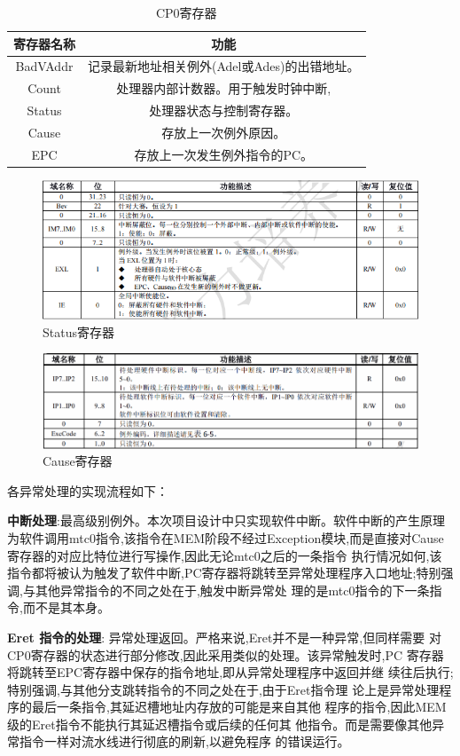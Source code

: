 \begin{table}[h]
\centering
\begin{tabular}{|c|c|} \hline 
	寄存器名称& 功能\\ \hline 
	BadVAddr& 记录最新地址相关例外(Adel或Ades)的出错地址。\\ \hline 
	Count& 处理器内部计数器。用于触发时钟中断,\\ \hline 
	Status& 处理器状态与控制寄存器。\\ \hline 
	Cause& 存放上一次例外原因。\\ \hline
	EPC&存放上一次发生例外指令的PC。\\\hline
\end{tabular}
\caption{CP0寄存器}
\label{tab:my_label}
\end{table}

\begin{figure}[h]
\centering
\includegraphics[width=0.5\linewidth]{image/P6.png}
\caption{Status寄存器}
\label{fig:enter-label}
\end{figure}
\begin{figure}[h]
\centering
\includegraphics[width=0.5\linewidth]{image/P7.png}
\caption{Cause寄存器}
\label{fig:enter-label}
\end{figure}
各异常处理的实现流程如下：

\textbf{中断处理}:最高级别例外。本次项目设计中只实现软件中断。软件中断的产生原理为软件调用mtc0指令,该指令在MEM阶段不经过Exception模块,而是直接对Cause寄存器的对应比特位进行写操作,因此无论mtc0之后的一条指令 执行情况如何,该指令都将被认为触发了软件中断,PC寄存器将跳转至异常处理程序入口地址;特别强调,与其他异常指令的不同之处在于,触发中断异常处 理的是mtc0指令的下一条指令,而不是其本身。 

\textbf{Eret 指令的处理}: 异常处理返回。严格来说,Eret并不是一种异常,但同样需要 对CP0寄存器的状态进行部分修改,因此采用类似的处理。该异常触发时,PC 寄存器将跳转至EPC寄存器中保存的指令地址,即从异常处理程序中返回并继 续往后执行;特别强调,与其他分支跳转指令的不同之处在于,由于Eret指令理 论上是异常处理程序的最后一条指令,其延迟槽地址内存放的可能是来自其他 程序的指令,因此MEM级的Eret指令不能执行其延迟槽指令或后续的任何其 他指令。而是需要像其他异常指令一样对流水线进行彻底的刷新,以避免程序 的错误运行。 

